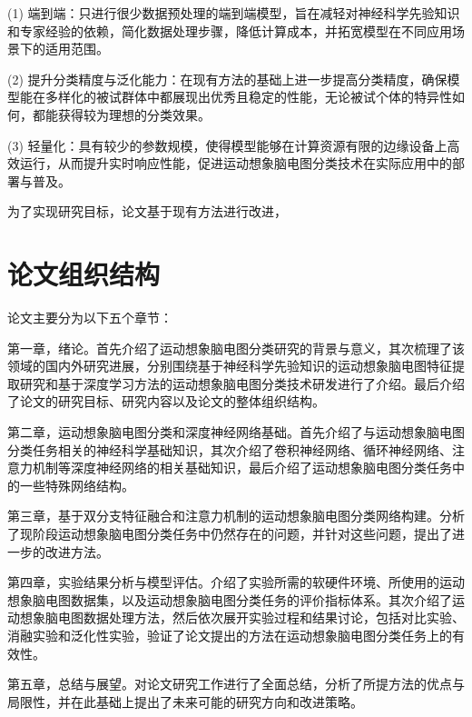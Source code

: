 (1) 端到端：只进行很少数据预处理的端到端模型，旨在减轻对神经科学先验知识和专家经验的依赖，简化数据处理步骤，降低计算成本，并拓宽模型在不同应用场景下的适用范围。

(2) 提升分类精度与泛化能力：在现有方法的基础上进一步提高分类精度，确保模型能在多样化的被试群体中都展现出优秀且稳定的性能，无论被试个体的特异性如何，都能获得较为理想的分类效果。

(3) 轻量化：具有较少的参数规模，使得模型能够在计算资源有限的边缘设备上高效运行，从而提升实时响应性能，促进运动想象脑电图分类技术在实际应用中的部署与普及。

为了实现研究目标，论文基于现有方法进行改进，

\section{论文组织结构}

论文主要分为以下五个章节：

第一章，绪论。首先介绍了运动想象脑电图分类研究的背景与意义，其次梳理了该领域的国内外研究进展，分别围绕基于神经科学先验知识的运动想象脑电图特征提取研究和基于深度学习方法的运动想象脑电图分类技术研发进行了介绍。最后介绍了论文的研究目标、研究内容以及论文的整体组织结构。

第二章，运动想象脑电图分类和深度神经网络基础。首先介绍了与运动想象脑电图分类任务相关的神经科学基础知识，其次介绍了卷积神经网络、循环神经网络、注意力机制等深度神经网络的相关基础知识，最后介绍了运动想象脑电图分类任务中的一些特殊网络结构。

第三章，基于双分支特征融合和注意力机制的运动想象脑电图分类网络构建。分析了现阶段运动想象脑电图分类任务中仍然存在的问题，并针对这些问题，提出了进一步的改进方法。

第四章，实验结果分析与模型评估。介绍了实验所需的软硬件环境、所使用的运动想象脑电图数据集，以及运动想象脑电图分类任务的评价指标体系。其次介绍了运动想象脑电图数据处理方法，然后依次展开实验过程和结果讨论，包括对比实验、消融实验和泛化性实验，验证了论文提出的方法在运动想象脑电图分类任务上的有效性。

第五章，总结与展望。对论文研究工作进行了全面总结，分析了所提方法的优点与局限性，并在此基础上提出了未来可能的研究方向和改进策略。